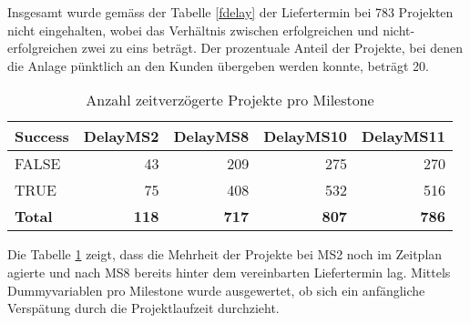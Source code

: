 Insgesamt wurde gemäss der Tabelle \ref{fdelay} der Liefertermin bei 783 Projekten nicht eingehalten, wobei das Verhältnis zwischen erfolgreichen und nicht-erfolgreichen zwei zu eins beträgt. Der prozentuale Anteil der Projekte, bei denen die Anlage pünktlich an den Kunden übergeben werden konnte, beträgt 20. 
\begin{table}[H]
	\centering
	\caption{Anzahl zeitverzögerte Projekte pro Milestone}
	\begin{tabular}{lrrrr}
		\textbf{Success} & \multicolumn{1}{l}{\textbf{DelayMS2}} & \multicolumn{1}{l}{\textbf{DelayMS8}} & \multicolumn{1}{l}{\textbf{DelayMS10}} & \multicolumn{1}{l}{\textbf{DelayMS11}} \\\hline
		FALSE & 43    & 209   & 275   & 270 \\
		TRUE  & 75    & 408   & 532   & 516 \\\hline
		\textbf{Total} & \textbf{118} & \textbf{717} & \textbf{807} &  \textbf{786}
	\end{tabular}%
	\label{fdelayms}%
\end{table}
Die Tabelle \ref{fdelayms} zeigt, dass die Mehrheit der Projekte bei MS2 noch im Zeitplan agierte und nach MS8 bereits hinter dem vereinbarten Liefertermin lag. Mittels Dummyvariablen pro Milestone wurde ausgewertet, ob sich ein anfängliche Verspätung durch die Projektlaufzeit durchzieht.
